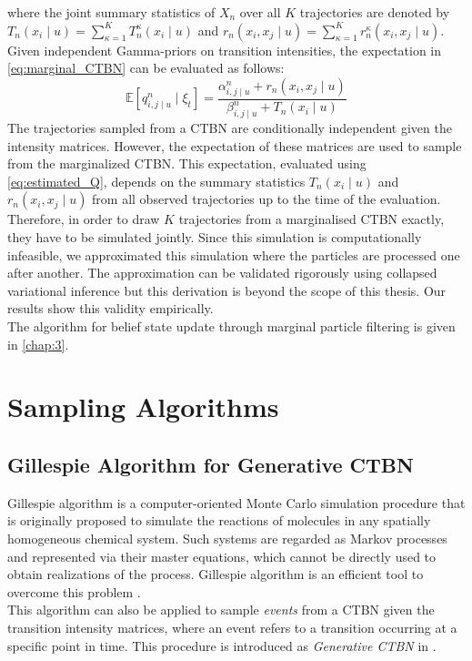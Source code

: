 where the joint summary statistics of $ X_n $ over all $ K $ trajectories are denoted by  $ T_{n}(x_i\mid u) = \sum_{\kappa=1}^{K} T_{n}^\kappa(x_i\mid u) $ and $ r_{n}(x_i, x_j\mid u) =\sum_{\kappa=1}^{K} r_{n}^\kappa(x_i, x_j\mid u)$.\\
Given independent Gamma-priors on transition intensities, the expectation in \autoref{eq:marginal_CTBN} can be evaluated as follows:
\begin{equation}
\mathbb{E}\left[q_{i,j\mid u}^{n} \mid \xi_{t}\right]=\frac{\alpha^n_{i,j\mid u}+r_{n}(x_i, x_j\mid u)}{\beta^n_{i,j\mid u}+T_{n}(x_i \mid u)}
\label{eq:estimated_Q}
\end{equation}
The trajectories sampled from a CTBN are conditionally independent given the intensity matrices. However, the expectation of these matrices are used to sample from the marginalized CTBN. This expectation, evaluated using \autoref{eq:estimated_Q}, depends on the summary statistics $T_{n}(x_i\mid u)$ and $ r_{n}(x_i, x_j\mid u)$ from all observed trajectories up to the time of the evaluation. Therefore, in order to draw $K$ trajectories from a marginalised CTBN exactly, they have to be simulated jointly. Since this simulation is computationally infeasible, we approximated this simulation where the particles are processed one after another. The approximation can be validated rigorously using collapsed variational inference but this derivation is beyond the scope of this thesis. Our results show this validity empirically. \\
The algorithm for belief state update through marginal particle filtering is given in \cref{chap:3}. 

\section{Sampling Algorithms}
\label{sec:sampling_alg}
\subsection{Gillespie Algorithm for Generative CTBN}
Gillespie algorithm is a computer-oriented Monte Carlo simulation procedure that is originally proposed to simulate the reactions of molecules in any spatially homogeneous chemical system. Such systems are regarded as Markov processes and represented via their master equations, which cannot be directly used to obtain realizations of the process. Gillespie algorithm is an efficient tool to overcome this problem \cite{Gillespie1976}.\\
This algorithm can also be applied to sample \textit{events} from a CTBN given the transition intensity matrices, where an event refers to a transition occurring at a specific point in time. This procedure is introduced as \textit{Generative CTBN} in \cite{Nodelman1995}.

